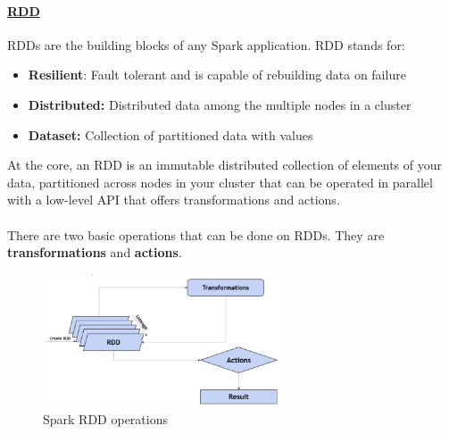 \documentclass[10pt,a4paper]{article}
\newcommand{\nline}{\\~\\}
\begin{document}
 \paragraph{\uline{RDD}}
 RDDs are the building blocks of any Spark application. RDD stands for:
 \begin{itemize}
 	\item \textbf{Resilient}: Fault tolerant and is capable of rebuilding data on failure
\item \textbf{Distributed:} Distributed data among the multiple nodes in a cluster
\item \textbf{Dataset:} Collection of partitioned data with values
 \end{itemize}
At the core, an RDD is an immutable distributed collection of elements of your data, partitioned across nodes in your cluster that can be operated in parallel with a low-level API that offers transformations and actions. \nline
There are two basic operations that can be done on RDDs. They are \textbf{transformations} and \textbf{actions}.
  \begin{figure}[ht!]
 \hfill \includegraphics[width=200pt]{images/spark-rdd-op}
 \hspace*{\fill}
 \caption{Spark RDD operations}
 \end{figure} 
\end{document}
